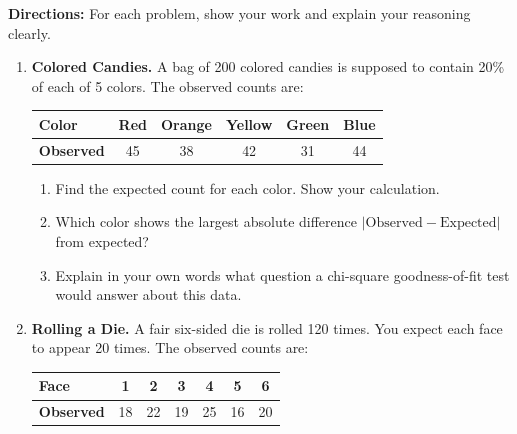 \documentclass[10pt]{article}
\begin{document}
\namedateperiod

\vspace{0.1in}
\textbf{Directions:} For each problem, show your work and explain your reasoning clearly.

\begin{enumerate}

  \item \textbf{Colored Candies.} A bag of 200 colored candies is supposed to contain
        20\% of each of 5 colors. The observed counts are:

        \vspace{0.05in}
        \renewcommand{\arraystretch}{1.3}
        \begin{tabularx}{0.75\linewidth}{Xccccc}
            \textbf{Color}    & Red & Orange & Yellow & Green & Blue \\
            \hline
            \textbf{Observed} & 45  & 38     & 42     & 31    & 44   \\
        \end{tabularx}

        \begin{enumerate}[label=\alph*.]
          \item Find the expected count for each color. Show your calculation.

          \item Which color shows the largest absolute difference
                $|\text{Observed} - \text{Expected}|$ from expected?

          \item Explain in your own words what question a chi-square goodness-of-fit
                test would answer about this data.
        \end{enumerate}

  \item \textbf{Rolling a Die.} A fair six-sided die is rolled 120 times. You expect
        each face to appear 20 times. The observed counts are:

        \vspace{0.05in}
        \renewcommand{\arraystretch}{1.3}
        \begin{tabularx}{0.75\linewidth}{Xcccccc}
            \textbf{Face}     & 1  & 2  & 3  & 4  & 5  & 6  \\
            \hline
            \textbf{Observed} & 18 & 22 & 19 & 25 & 16 & 20 \\
        \end{tabularx}


\end{enumerate}
\end{document}
